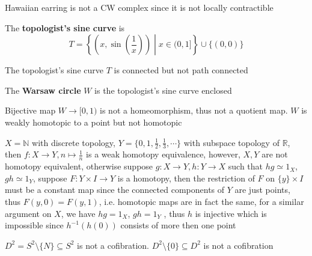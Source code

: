 \documentclass[main]{subfiles}
\begin{document}
\begin{proposition}
Hawaiian earring is not a CW complex since it is not locally contractible
\end{proposition}

\begin{example}
The \textbf{topologist's sine curve} is
\[T=\left\{\left(x,\sin\left(\frac{1}{x}\right)\right)\middle|x\in(0,1]\right\}\cup\{(0,0)\}\]
\begin{center}
\end{center}
\end{example}

\begin{proposition}
The topologist's sine curve $T$ is connected but not path connected
\end{proposition}

\begin{example}
The \textbf{Warsaw circle} $W$ is the topologist's sine curve enclosed \par
Bijective map $W\to[0,1)$ is not a homeomorphism, thus not a quotient map. $W$ is weakly homotopic to a point but not homotopic
\end{example}

\begin{example}
$X=\mathbb N$ with discrete topology, $Y=\{0,1,\frac{1}{2},\frac{1}{3},\cdots\}$ with subspace topology of $\mathbb R$, then $f:X\to Y, n\mapsto\frac{1}{n}$ is a weak homotopy equivalence, however, $X,Y$ are not homotopy equivalent, otherwise suppose $g:X\to Y,h:Y\to X$ such that $hg\simeq1_X$, $gh\simeq1_Y$, suppose $F:Y\times I\to Y$ is a homotopy, then the restriction of $F$ on $\{y\}\times I$ must be a constant map since the connected components of $Y$ are just points, thus $F(y,0)=F(y,1)$, i.e. homotopic maps are in fact the same, for a similar argument on $X$, we have $hg=1_X$, $gh=1_Y$ , thus $h$ is injective which is impossible since $h^{-1}(h(0))$ consists of more then one point
\end{example}

\begin{example}\label{Cofibration counterexample}
$D^2=S^2\setminus\{N\}\subseteq S^2$ is not a cofibration. $D^2\setminus\{0\}\subseteq D^2$ is not a cofibration
\end{example}
\end{document}
